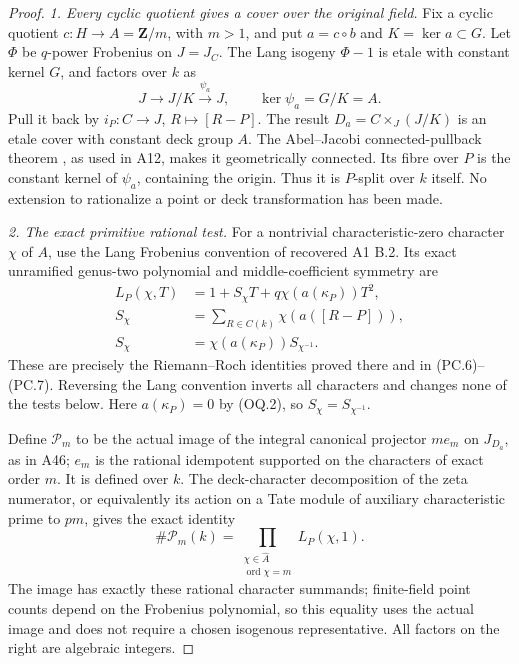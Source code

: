 \begin{proof}
\emph{1. Every cyclic quotient gives a cover over the original field.}
Fix a cyclic quotient $c:H\to A=\mathbf Z/m$, with $m>1$, and put
$a=c\circ b$ and $K=\ker a\subset G$.
Let $\Phi$ be $q$-power Frobenius on $J=J_C$. The Lang isogeny
$\Phi-1$ is etale with constant kernel $G$, and factors over $k$ as
\[
             J\longrightarrow J/K\xrightarrow{\psi_a}J,
                    \qquad \ker\psi_a=G/K=A.
 \tag{OQ.6}
\]
Pull it back by $i_P:C\to J$, $R\mapsto[R-P]$.
The result $D_a=C\times_J(J/K)$ is an etale cover with constant
deck group $A$. The Abel--Jacobi connected-pullback theorem
\cite[Proposition~9.1]{MilneJV}, as used in A12, makes it
geometrically connected. Its fibre over $P$ is the constant kernel
of $\psi_a$, containing the origin. Thus it is $P$-split over $k$
itself. No extension to rationalize a point or deck transformation
has been made.

\emph{2. The exact primitive rational test.}
For a nontrivial characteristic-zero character $\chi$ of $A$, use
the Lang Frobenius convention of recovered A1 B.2. Its exact
unramified genus-two polynomial and middle-coefficient symmetry are
\[
\begin{aligned}
 L_P(\chi,T)&=1+S_\chi T+q\chi(a(\kappa_P))T^2,\\
 S_\chi&=\sum_{R\in C(k)}\chi(a([R-P])),\\
 S_\chi&=\chi(a(\kappa_P))S_{\chi^{-1}}.
\end{aligned}
 \tag{OQ.7}
\]
These are precisely the Riemann--Roch identities proved there
and in (PC.6)--(PC.7). Reversing the Lang convention inverts all
characters and changes none of the tests below. Here
$a(\kappa_P)=0$ by (OQ.2), so $S_\chi=S_{\chi^{-1}}$.

Define $\mathcal P_m$ to be the actual image of the integral
canonical projector $m e_m$ on $J_{D_a}$, as in A46; $e_m$ is
the rational idempotent supported on the characters of exact
order $m$. It is defined over $k$. The deck-character decomposition
of the zeta numerator, or equivalently its action on a Tate module
of auxiliary characteristic prime to $pm$, gives the exact identity
\[
       \#\mathcal P_m(k)
       =\prod_{\substack{\chi\in\widehat A\\\operatorname{ord}\chi=m}}
                         L_P(\chi,1).
 \tag{OQ.8}
\]
The image has exactly these rational character summands; finite-field
point counts depend on the Frobenius polynomial, so this equality
uses the actual image and does not require a chosen isogenous
representative. All factors on the right are algebraic integers.


\end{proof}
